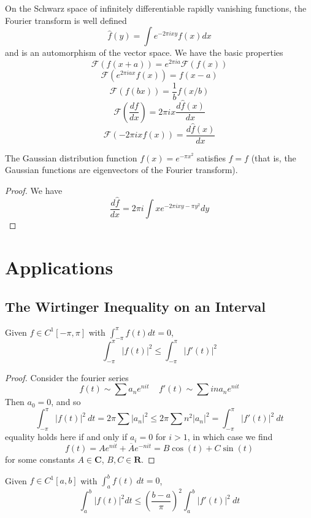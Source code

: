 On the Schwarz space of infinitely differentiable rapidly vanishing functions, the Fourier transform is well defined
%
\[ \widehat{f}(y) = \int e^{- 2 \pi i x y} f(x) dx \]
%
and is an automorphism of the vector space. We have the basic properties
%
\[ \mathcal{F}(f(x + a)) = e^{2 \pi i a} \mathcal{F}(f(x)) \]
%
\[ \mathcal{F}(e^{2 \pi i a x} f(x)) = f(x-a) \]
%
\[ \mathcal{F}(f(bx)) = \frac{1}{b} f(x/b) \]
%
\[ \mathcal{F}\left( \frac{df}{dx} \right) = 2 \pi i x \frac{d\widehat{f}(x) }{dx} \]
%
\[ \mathcal{F}(- 2 \pi i x f(x)) = \frac{d\widehat{f}(x)}{dx} \]

\begin{theorem}
    The Gaussian distribution function $f(x) = e^{- \pi x^2}$ satisfies $\widehat{f} = f$ (that is, the Gaussian functions are eigenvectors of the Fourier transform).
\end{theorem}
\begin{proof}
    We have
    \[ \frac{d\widehat{f}}{dx} = 2 \pi i \int x e^{-2 \pi i x y - \pi y^2} dy \]
\end{proof}

\chapter{Applications}

\section{The Wirtinger Inequality on an Interval}

\begin{theorem}
    Given $f \in C^1[-\pi,\pi]$ with $\int_{-\pi}^\pi f(t) dt = 0$,
    \[ \int_{-\pi}^\pi |f(t)|^2 \leq \int_{-\pi}^\pi |f'(t)|^2 \]
\end{theorem}
\begin{proof}
    Consider the fourier series
    \[ f(t) \sim \sum a_n e^{nit}\ \ \ \ \ f'(t) \sim \sum in a_n e^{nit} \]
    Then $a_0 = 0$, and so
    \[ \int_{-\pi}^\pi |f(t)|^2\ dt = 2 \pi \sum |a_n|^2 \leq 2 \pi \sum n^2 |a_n|^2 = \int_{-\pi}^\pi |f'(t)|^2\ dt \]
    equality holds here if and only if $a_i = 0$ for $i > 1$, in which case we find
    \[ f(t) = A e^{nit} + \overline{A} e^{-nit} = B \cos(t) + C \sin(t) \]
    for some constants $A \in \mathbf{C}$, $B,C \in \mathbf{R}$.
\end{proof}

\begin{corollary}
    Given $f \in C^1[a,b]$ with $\int_a^b f(t)\ dt = 0$, 
    \[ \int_a^b |f(t)|^2 dt \leq \left(\frac{b-a}{\pi}\right)^2 \int_a^b |f'(t)|^2\ dt \]
\end{corollary}

